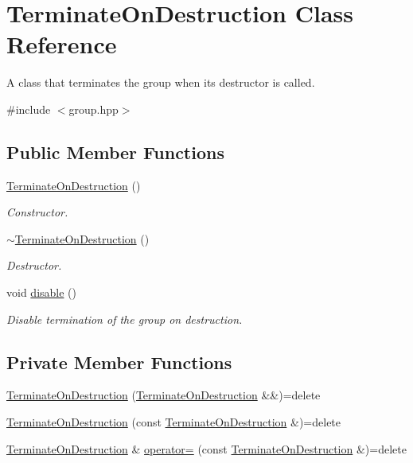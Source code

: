 \hypertarget{class_terminate_on_destruction}{}\section{Terminate\+On\+Destruction Class Reference}
\label{class_terminate_on_destruction}


A class that terminates the group when its destructor is called.  




{\ttfamily \#include $<$group.\+hpp$>$}

\subsection*{Public Member Functions}
\begin{DoxyCompactItemize}
\item 
\hyperlink{class_terminate_on_destruction_ac1b230c0858db2e39b83188eae7c5a8e}{Terminate\+On\+Destruction} ()
\begin{DoxyCompactList}\small\item\em Constructor. \end{DoxyCompactList}\item 
\hyperlink{class_terminate_on_destruction_a1e2e372004731b788bb9df84d618181f}{$\sim$\+Terminate\+On\+Destruction} ()
\begin{DoxyCompactList}\small\item\em Destructor. \end{DoxyCompactList}\item 
void \hyperlink{class_terminate_on_destruction_a3ee7e31e435328d6ff97edd5627f7c27}{disable} ()
\begin{DoxyCompactList}\small\item\em Disable termination of the group on destruction. \end{DoxyCompactList}\end{DoxyCompactItemize}
\subsection*{Private Member Functions}
\begin{DoxyCompactItemize}
\item 
\hyperlink{class_terminate_on_destruction_afbcf618507814357fc16fcf49ac27316}{Terminate\+On\+Destruction} (\hyperlink{class_terminate_on_destruction}{Terminate\+On\+Destruction} \&\&)=delete
\item 
\hyperlink{class_terminate_on_destruction_aaf44815fef9e402548f3fe950bc23a82}{Terminate\+On\+Destruction} (const \hyperlink{class_terminate_on_destruction}{Terminate\+On\+Destruction} \&)=delete
\item 
\hyperlink{class_terminate_on_destruction}{Terminate\+On\+Destruction} \& \hyperlink{class_terminate_on_destruction_aef7320686e582846fd4e30c142feec18}{operator=} (const \hyperlink{class_terminate_on_destruction}{Terminate\+On\+Destruction} \&)=delete
\end{DoxyCompactItemize}
